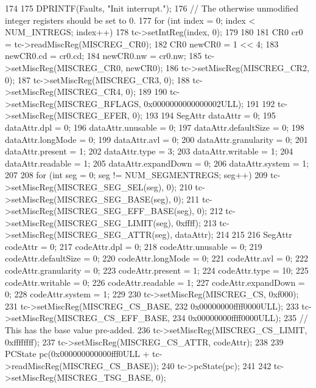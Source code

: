 \begin{DoxyCode}
174     {
175         DPRINTF(Faults, "Init interrupt.\n");
176         // The otherwise unmodified integer registers should be set to 0.
177         for (int index = 0; index < NUM_INTREGS; index++) {
178             tc->setIntReg(index, 0);
179         }
180 
181         CR0 cr0 = tc->readMiscReg(MISCREG_CR0);
182         CR0 newCR0 = 1 << 4;
183         newCR0.cd = cr0.cd;
184         newCR0.nw = cr0.nw;
185         tc->setMiscReg(MISCREG_CR0, newCR0);
186         tc->setMiscReg(MISCREG_CR2, 0);
187         tc->setMiscReg(MISCREG_CR3, 0);
188         tc->setMiscReg(MISCREG_CR4, 0);
189 
190         tc->setMiscReg(MISCREG_RFLAGS, 0x0000000000000002ULL);
191 
192         tc->setMiscReg(MISCREG_EFER, 0);
193 
194         SegAttr dataAttr = 0;
195         dataAttr.dpl = 0;
196         dataAttr.unusable = 0;
197         dataAttr.defaultSize = 0;
198         dataAttr.longMode = 0;
199         dataAttr.avl = 0;
200         dataAttr.granularity = 0;
201         dataAttr.present = 1;
202         dataAttr.type = 3;
203         dataAttr.writable = 1;
204         dataAttr.readable = 1;
205         dataAttr.expandDown = 0;
206         dataAttr.system = 1;
207 
208         for (int seg = 0; seg != NUM_SEGMENTREGS; seg++) {
209             tc->setMiscReg(MISCREG_SEG_SEL(seg), 0);
210             tc->setMiscReg(MISCREG_SEG_BASE(seg), 0);
211             tc->setMiscReg(MISCREG_SEG_EFF_BASE(seg), 0);
212             tc->setMiscReg(MISCREG_SEG_LIMIT(seg), 0xffff);
213             tc->setMiscReg(MISCREG_SEG_ATTR(seg), dataAttr);
214         }
215 
216         SegAttr codeAttr = 0;
217         codeAttr.dpl = 0;
218         codeAttr.unusable = 0;
219         codeAttr.defaultSize = 0;
220         codeAttr.longMode = 0;
221         codeAttr.avl = 0;
222         codeAttr.granularity = 0;
223         codeAttr.present = 1;
224         codeAttr.type = 10;
225         codeAttr.writable = 0;
226         codeAttr.readable = 1;
227         codeAttr.expandDown = 0;
228         codeAttr.system = 1;
229 
230         tc->setMiscReg(MISCREG_CS, 0xf000);
231         tc->setMiscReg(MISCREG_CS_BASE,
232                 0x00000000ffff0000ULL);
233         tc->setMiscReg(MISCREG_CS_EFF_BASE,
234                 0x00000000ffff0000ULL);
235         // This has the base value pre-added.
236         tc->setMiscReg(MISCREG_CS_LIMIT, 0xffffffff);
237         tc->setMiscReg(MISCREG_CS_ATTR, codeAttr);
238 
239         PCState pc(0x000000000000fff0ULL + tc->readMiscReg(MISCREG_CS_BASE));
240         tc->pcState(pc);
241 
242         tc->setMiscReg(MISCREG_TSG_BASE, 0);
}
\end{DoxyCode}
